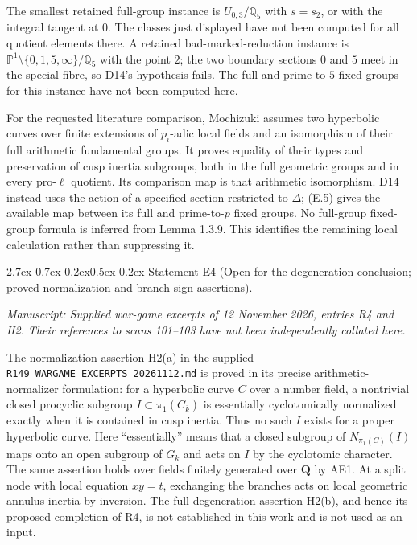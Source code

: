 \documentclass[11pt,a4paper]{article}
\makeatletter
\newcommand{\passage}[1]{\par\smallskip\noindent\textit{Manuscript: #1}\par\smallskip}
\renewcommand\paragraph{\@startsection{paragraph}{4}{\z@}%
  {2.7ex \@plus 0.7ex \@minus 0.2ex}{0.5ex \@plus 0.2ex}%
  {\normalfont\normalsize\bfseries}}
\makeatother
\begin{document}
The smallest retained full-group instance is $U_{0,3}/\mathbb Q_5$
with $s=s_2$, or with the integral tangent at $0$.  The classes just
displayed have not been computed for all quotient elements there.
A retained bad-marked-reduction instance is
$\mathbb P^1\setminus\{0,1,5,\infty\}/\mathbb Q_5$ with the point $2$;
the two boundary sections $0$ and $5$ meet in the special fibre, so
D14's hypothesis fails.  The full and prime-to-$5$ fixed groups for
this instance have not been computed here.

For the requested literature comparison, Mochizuki
\cite[Lemma 1.3.9]{D_Mochizuki2004} assumes two hyperbolic curves over
finite extensions of $p_i$-adic local fields and an isomorphism of
their full arithmetic fundamental groups.  It proves equality of
their types and preservation of cusp inertia subgroups, both in the
full geometric groups and in every pro-$\ell$ quotient.  Its comparison
map is that arithmetic isomorphism.  D14 instead uses the action of a
specified section restricted to $\Delta$; (E.5) gives the available
map between its full and prime-to-$p$ fixed groups.  No full-group
fixed-group formula is inferred from Lemma 1.3.9.  This identifies the
remaining local calculation rather than suppressing it.



\paragraph{Statement E4 (Open for the degeneration conclusion; proved
normalization and branch-sign assertions).}\label{res:E4}
\passage{Supplied war-game excerpts of 12 November 2026, entries R4 and H2.
Their references to scans 101--103 have not been independently collated here.}
The normalization assertion H2(a) in the supplied
\texttt{R149\_WARGAME\_EXCERPTS\_20261112.md} is proved in its precise
arithmetic-normalizer formulation: for a hyperbolic curve $C$ over a
number field, a nontrivial closed procyclic subgroup
$I\subset\pi_1(C_{\overline k})$ is essentially cyclotomically
normalized exactly when it is contained in cusp inertia. Thus no such
$I$ exists for a proper hyperbolic curve. Here ``essentially'' means
that a closed subgroup of $N_{\pi_1(C)}(I)$ maps onto an open subgroup
of $G_k$ and acts on $I$ by the cyclotomic character. The same assertion
holds over fields finitely generated over $\mathbf Q$ by AE1.
At a split node with local equation $xy=t$, exchanging the branches
acts on local geometric annulus inertia by inversion. The full
degeneration assertion H2(b), and hence its proposed completion of R4,
is not established in this work and is not used as an input.
\end{document}
